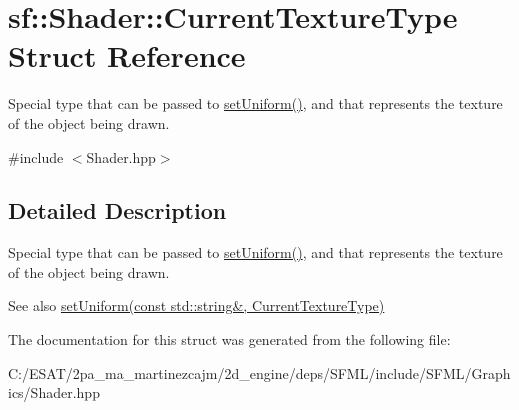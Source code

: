 \hypertarget{structsf_1_1_shader_1_1_current_texture_type}{}\section{sf\+:\+:Shader\+:\+:Current\+Texture\+Type Struct Reference}
\label{structsf_1_1_shader_1_1_current_texture_type}


Special type that can be passed to \hyperlink{classsf_1_1_shader_abf78e3bea1e9b0bab850b6b0a0de29c7}{set\+Uniform()}, and that represents the texture of the object being drawn.  




{\ttfamily \#include $<$Shader.\+hpp$>$}



\subsection{Detailed Description}
Special type that can be passed to \hyperlink{classsf_1_1_shader_abf78e3bea1e9b0bab850b6b0a0de29c7}{set\+Uniform()}, and that represents the texture of the object being drawn. 

\begin{DoxySeeAlso}{See also}
\hyperlink{classsf_1_1_shader_ab18f531e1f726b88fec1cf5a1e6af26d}{set\+Uniform(const std\+::string\&, Current\+Texture\+Type)} 
\end{DoxySeeAlso}


The documentation for this struct was generated from the following file\+:\begin{DoxyCompactItemize}
\item 
C\+:/\+E\+S\+A\+T/2pa\+\_\+ma\+\_\+martinezcajm/2d\+\_\+engine/deps/\+S\+F\+M\+L/include/\+S\+F\+M\+L/\+Graphics/Shader.\+hpp\end{DoxyCompactItemize}
